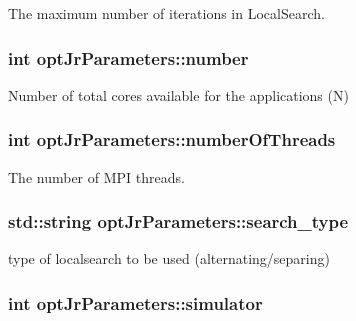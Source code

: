 The maximum number of iterations in Local\-Search. 

\hypertarget{classoptJrParameters_a9d99c995ae7815448131832e13b7c723}{
\subsubsection[{number}]{\setlength{\rightskip}{0pt plus 5cm}int opt\-Jr\-Parameters\-::number\hspace{0.3cm}{\ttfamily [private]}}}\label{classoptJrParameters_a9d99c995ae7815448131832e13b7c723}


Number of total cores available for the applications (N) 

\hypertarget{classoptJrParameters_a7748d7ba51ef897423d145f2e33273d8}{
\subsubsection[{number\-Of\-Threads}]{\setlength{\rightskip}{0pt plus 5cm}int opt\-Jr\-Parameters\-::number\-Of\-Threads\hspace{0.3cm}{\ttfamily [private]}}}\label{classoptJrParameters_a7748d7ba51ef897423d145f2e33273d8}


The number of M\-P\-I threads. 

\hypertarget{classoptJrParameters_ace4df9a02106cc7c3f7e8e65cb94770f}{
\subsubsection[{search\-\_\-type}]{\setlength{\rightskip}{0pt plus 5cm}std\-::string opt\-Jr\-Parameters\-::search\-\_\-type\hspace{0.3cm}{\ttfamily [private]}}}\label{classoptJrParameters_ace4df9a02106cc7c3f7e8e65cb94770f}


type of localsearch to be used (alternating/separing) 

\hypertarget{classoptJrParameters_a8bb0a0aa1f458ff3973fbe43552e1cd5}{
\subsubsection[{simulator}]{\setlength{\rightskip}{0pt plus 5cm}int opt\-Jr\-Parameters\-::simulator\hspace{0.3cm}{\ttfamily [private]}}}\label{classoptJrParameters_a8bb0a0aa1f458ff3973fbe43552e1cd5}


